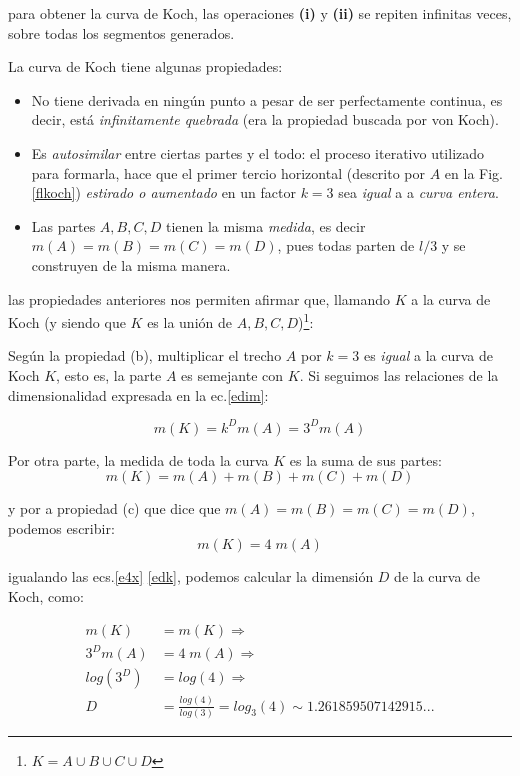 \documentclass[10pt,a4paper]{article}
\numberwithin{equation}{section}
\begin{document}
\noindent para obtener la curva de Koch, las operaciones \textbf{(i)} y \textbf{(ii)} se repiten infinitas veces, sobre todas los segmentos generados.

La curva de Koch tiene algunas propiedades:
\begin{itemize}
\item[(a)] No tiene derivada en ningún punto a pesar de ser perfectamente continua, es decir, está \textit{infinitamente quebrada} (era la propiedad buscada por von Koch).
\item[(b)] Es \textit{autosimilar} entre ciertas partes y el todo: el proceso iterativo utilizado para formarla, hace que el primer tercio horizontal (descrito por $A$ en la Fig.\eqref{flkoch}) \textit{estirado o aumentado} en un factor $k = 3$ sea \textit{igual} a a \textit{curva entera}.
\item[(c)] Las partes $A, B,C,D$ tienen la misma \textit{medida}, es decir $m(A)=m(B)=m(C)=m(D)$, pues todas parten de $l/3$ y se construyen de la misma manera.
\end{itemize}

\noindent las propiedades anteriores nos permiten afirmar que, llamando $K$ a la curva de Koch (y siendo que $K$ es la unión de $A,B,C,D$)\footnote{$K = A \cup B \cup C \cup D$}:

\noindent  Según la propiedad (b), multiplicar el trecho $A$ por $k = 3$ es \textit{igual} a la curva de Koch $K$, esto es, la parte $A$ es semejante con $K$. Si seguimos las relaciones de la dimensionalidad expresada en la ec.\eqref{edim}:

\begin{equation}\label{edk}
m(K) = k^D m(A) = 3^D m(A)
\end{equation}

\noindent Por otra parte, la medida de toda la curva $K$ es la suma de sus partes:
\begin{equation}\label{esuma}
m(K) = m(A) + m(B) + m(C) + m(D) 
\end{equation}

\noindent y por a propiedad (c) que dice que $m(A) = m(B) = m(C) = m(D)$, podemos escribir:
\begin{equation}\label{e4x}
m(K) =4 \;m(A)
\end{equation}

\noindent igualando las ecs.\eqref{e4x} \eqref{edk}, podemos calcular la dimensión $D$ de la curva de Koch, como:

 \begin{align}\label{edimk}
 m(K) &= m(K) \Rightarrow \nonumber \\
 3^D m(A)  &= 4 \; m(A)  \Rightarrow \nonumber \\
 log(3^D) &= log(4) \Rightarrow \nonumber \\
 D &= \frac{log(4)}{log(3)} = log_3(4) \sim 1.261859507142915... 
 \end{align}
\end{document}
